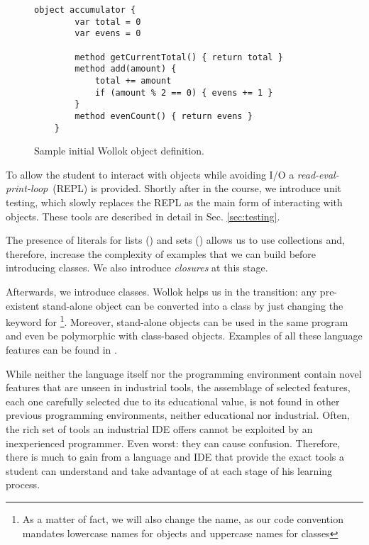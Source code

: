 \begin{figure}[ht]
\vspace{-3mm}
 \centering
 \begin{lstlisting}[language=Wollok]
	object accumulator {
		var total = 0
		var evens = 0
		
		method getCurrentTotal() { return total }
		method add(amount) { 
			total += amount 
			if (amount % 2 == 0) { evens += 1 }
		}
		method evenCount() { return evens }
	}\end{lstlisting}
\vspace{-3mm}
\caption{\small Sample initial Wollok object definition.}
\label{fig:helloWorld/wollok}
\vspace{-3mm}
\end{figure}

To allow the student to interact with objects while avoiding I/O a \emph{read-eval-print-loop}~(REPL) is provided.
Shortly after in the course, we introduce unit testing, 
which slowly replaces the REPL as the main form of interacting with objects. 
These tools are described in detail in Sec. \ref{sec:testing}.

The presence of literals for lists (\eg \code{[1,2,3]}) and sets (\eg {})
allows us to use collections and, therefore, 
increase the complexity of examples that we can build before introducing classes.
We also introduce \emph{closures} at this stage.

Afterwards, we introduce classes.
Wollok helps us in the transition: any pre-existent stand-alone object can be converted into a class by just changing the keyword  for %
\footnote{As a matter of fact, we will also change the name, as our code convention mandates lowercase names for objects and uppercase names for classes}.
Moreover, stand-alone objects can be used in the same program and even be polymorphic with class-based objects.
Examples of all these language features can be found in \cite{passerini2017wollok}.

\medskip

While neither the language itself nor the programming environment 
contain novel features that are unseen in industrial tools,
the assemblage of selected features, 
each one carefully selected due to its educational value,
is not found in other previous programming environments, 
neither educational nor industrial.
Often, the rich set of tools an industrial IDE offers 
cannot be exploited by an inexperienced programmer.
Even worst: they can cause confusion.
Therefore, there is much to gain from a language and IDE that provide the exact tools 
a student can understand and take advantage of at each stage of his learning process.

